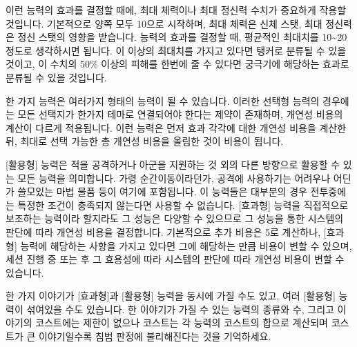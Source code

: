 \documentclass{report}
\begin{document}
	이런 능력의 효과를 결정할 때에, 최대 체력이나 최대 정신력 수치가 중요하게 작용할 것입니다. 기본적으로 양쪽 모두 10으로 시작하며, 최대 체력은 신체 스탯, 최대 정신력은 정신 스탯의 영향을 받습니다. 능력의 효과를 결정할 때, 평균적인 최대치를 10\textasciitilde20정도로 생각하시면 됩니다. 이 이상의 최대치를 가지고 있다면 탱커로 분류될 수 있을 것이고, 이 수치의 50\% 이상의 피해를 한번에 줄 수 있다면 궁극기에 해당하는 효과로 분류될 수 있을 것입니다.
	
	한 가지 능력은 여러가지 형태의 능력이 될 수 있습니다. 이러한 선택형 능력의 경우에는 모든 선택지가 한가지 테마로 연결되어야 한다는 제약이 존재하며, 개연성 비용의 계산이 다르게 적용됩니다. 이런 능력은 먼저 효과 각각에 대한 개연성 비용을 계산한 뒤, 최대로 선택 가능한 총 개연성 비용을 올림한 것이 비용이 됩니다.
	
	[활용형] 능력은 적을 공격하거나 아군을 지원하는 것 외의 다른 방향으로 활용할 수 있는 모든 능력을 의미합니다. 가령 순간이동이라던가, 공격에 사용하기는 어려우나 어딘가 쓸모있는 마법 물품 등이 여기에 포함됩니다. 이 능력들은 대부분의 경우 전투중에는 특정한 조건이 충족되지 않는다면 사용할 수 없습니다. [효과형] 능력을 직접적으로 보조하는 능력이라 할지라도 그 성능은 다양할 수 있으므로 그 성능을 통한 시스템의 판단에 따라 개연성 비용을 결정합니다. 기본적으로 추가 비용은 5로 계산하나, [효과형] 능력에 해당하는 사항을 가지고 있다면 그에 해당하는 만큼 비용이 변할 수 있으며, 세션 진행 중 또는 후 그 효용성에 따라 시스템의 판단에 따라 개연성 비용이 변할 수 있습니다.
	
	한 가지 이야기가 [효과형]과 [활용형] 능력을 동시에 가질 수도 있고, 여러 [활용형] 능력이 섞여있을 수도 있습니다. 한 이야기가 가질 수 있는 능력의 종류와 수, 그리고 이야기의 코스트에는 제한이 없으나 코스트는 각 능력의 코스트의 합으로 계산되며 코스트가 큰 이야기일수록 침범 판정에 불리해진다는 것을 기억하세요.
	
	\bigskip
	
\end{document}
